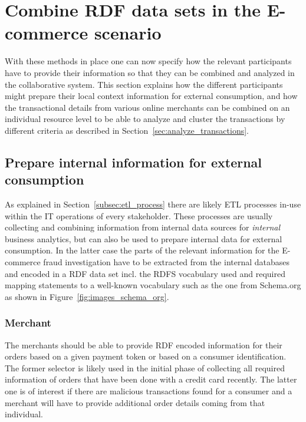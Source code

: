 
\section{Combine \gls{RDF} data sets in the \gls{E-commerce} scenario}
\label{sec:working_semantic_data}

With these methods in place one can now specify how the relevant participants have to provide their information so that they can be combined and analyzed in the collaborative system. This section explains how the different participants might prepare their local context information for external consumption, and how the transactional details from various online merchants can be combined on an individual resource level to be able to analyze and cluster the transactions by different criteria as described in Section~\ref{sec:analyze_transactions}.

\subsection{Prepare internal information for external consumption}
\label{subsec:prepare_information}

As explained in Section~\ref{subsec:etl_process} there are likely \gls{ETL} processes in-use within the \gls{IT} operations of every stakeholder. These processes are usually collecting and combining information from internal data sources for \emph{internal} business analytics, but can also be used to prepare internal data for external consumption. In the latter case the parts of the relevant information for the \gls{E-commerce} fraud investigation have to be extracted from the internal databases and encoded in a \gls{RDF} data set incl. the \gls{RDFS} vocabulary used and required mapping statements to a well-known vocabulary such as the one from Schema.org as shown in Figure~\ref{fig:images_schema_org}.

\subsubsection{Merchant}
\label{subsub:prep_info_merchant}

The merchants should be able to provide \gls{RDF} encoded information for their orders based on a given payment token or based on a consumer identification. The former selector is likely used in the initial phase of collecting all required information of orders that have been done with a credit card recently. The latter one is of interest if there are malicious transactions found for a consumer and a merchant will have to provide additional order details coming from that individual. \\

